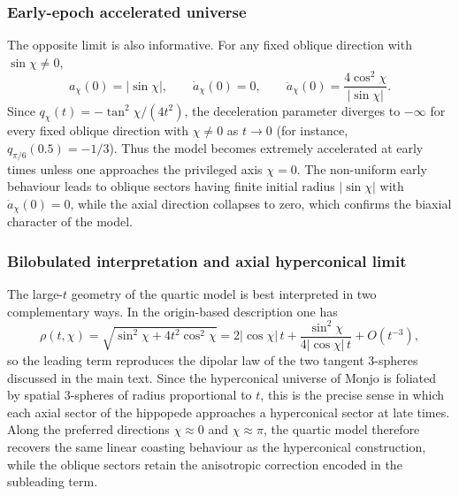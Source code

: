 \documentclass[3p,times,twocolumn]{elsarticle}
\begin{document}
\subsubsection*{Early-epoch accelerated universe}



The opposite limit is also informative. For any fixed oblique direction with $\sin\chi\neq0$,
\begin{equation}
a_\chi(0)=|\sin\chi|,\qquad \dot a_\chi(0)=0,\qquad \ddot a_\chi(0)=\frac{4\cos^2\chi}{|\sin\chi|}.
\end{equation}
Since $q_\chi(t)=-\tan^2\chi/(4t^2)$, the deceleration parameter diverges to $-\infty$ for every fixed oblique direction with $\chi\neq0$ as $t\to0$ (for instance, $q_{\pi/6}(0.5)=-1/3$). Thus the model becomes extremely accelerated at early times unless one approaches the privileged axis $\chi=0$. The non-uniform early behaviour leads to oblique sectors having finite initial radius $|\sin\chi|$ with $\dot a_\chi(0)=0$, while the axial direction collapses to zero, which confirms the biaxial character of the model.


\subsubsection*{Bilobulated interpretation and axial hyperconical limit}

The large-$t$ geometry of the quartic model is best interpreted in two complementary ways. In the origin-based description one has
\begin{equation}
\rho(t,\chi)=\sqrt{\sin^2\chi+4t^2\cos^2\chi}
=2|{\cos\chi}|\,t+\frac{\sin^2\chi}{4|{\cos\chi}|\,t}+O(t^{-3}),
\end{equation}
so the leading term reproduces the dipolar law of the two tangent $3$-spheres discussed in the main text. Since the hyperconical universe of Monjo is foliated by spatial $3$-spheres of radius proportional to $t$, this is the precise sense in which each axial sector of the hippopede approaches a hyperconical sector at late times. Along the preferred directions $\chi\approx0$ and $\chi\approx\pi$, the quartic model therefore recovers the same linear coasting behaviour as the hyperconical construction, while the oblique sectors retain the anisotropic correction encoded in the subleading term.
\end{document}
